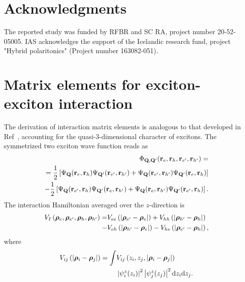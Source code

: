 \documentclass[prb,twocolumn,preprintnumbers,superscriptaddress]{revtex4}
\begin{document}
\section*{Acknowledgments}

The reported study was funded by RFBR and SC RA, project number 20-52-05005.
IAS acknowledges the support of the Icelandic research fund, project "Hybrid polaritonics" (Project number 163082-051).


\appendix 

\section{Matrix elements for exciton-exciton interaction}

The derivation of interaction matrix elements is analogous to that developed in Ref~\cite{Ciuti1998}, accounting for the quasi-3-dimensional character of excitons.
The symmetrized two exciton wave function reads as
%
\begin{align}
    \Phi_{\mathbf{Q},\mathbf{Q}'}(\mathbf{r}_e,\mathbf{r}_h,\mathbf{r}_{e'},\mathbf{r}_{h'})=\notag \\
    = \frac{1}{2}\left[ 
    \Psi_{\mathbf{Q}}(\mathbf{r}_e,\mathbf{r}_h) \Psi_{\mathbf{Q}'}(\mathbf{r}_{e'},\mathbf{r}_{h'}) 
    + \Psi_{\mathbf{Q}}(\mathbf{r}_{e'}, \mathbf{r}_{h'})\Psi_{\mathbf{Q}'}(\mathbf{r}_e,\mathbf{r}_h) \right] \notag \\
    - \frac{1}{2}\left[ 
    \Psi_{\mathbf{Q}}(\mathbf{r}_{e'},\mathbf{r}_h)\Psi_{\mathbf{Q}'}(\mathbf{r}_e,\mathbf{r}_{h'})
    + \Psi_{\mathbf{Q}}(\mathbf{r}_e,\mathbf{r}_{h'})\Psi_{\mathbf{Q}'}(\mathbf{r}_{e'},\mathbf{r}_h) \right].
\end{align}
%
The interaction Hamiltonian averaged over the $z$-direction is
%
\begin{align}
    V_I \left( {\bm \rho}_e, {\bm \rho} _{e^\prime}, {\bm \rho}_h, {\bm \rho}_{h^\prime} \right) = 
    &V_{ee}\left( \left| {\bm \rho}_{e^\prime} - {\bm \rho}_e \right| \right)
    + V_{hh}\left( \left| {\bm \rho}_{h^\prime} - {\bm \rho}_h \right| \right) \notag \\
    - &V_{eh}\left( \left| {\bm \rho}_{h^\prime} - {\bm \rho}_e \right| \right)
    - V_{he}\left( \left| {\bm \rho}_{e^\prime} - {\bm \rho}_h \right| \right),
\end{align}
%
where
%
\begin{align}
    \label{v_ee}
    V_{ij}\left( \left| {\bm \rho}_i - {\bm \rho}_j \right| \right) =    
     \int & V_{ij} \left(z_i, z_j, \left| {\bm \rho}_i - {\bm \rho}_j \right|  \right) \notag \\
    & \left| \psi_i^z( z_i) \right|^2 
    \left| \psi_j^z( z_j) \right|^2  {\rm d} z_i {\rm d} z_j .
\end{align}
\end{document}
